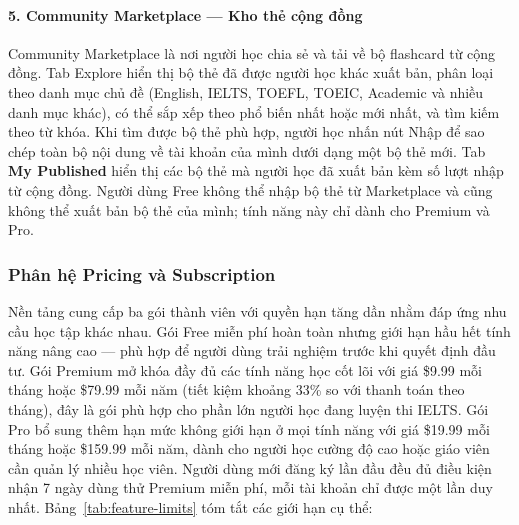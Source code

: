 \paragraph{5. Community Marketplace --- Kho thẻ cộng đồng}

Community Marketplace là nơi người học chia sẻ và tải về bộ flashcard từ cộng đồng. Tab Explore hiển thị bộ thẻ đã được người học khác xuất bản, phân loại theo danh mục chủ đề (English, IELTS, TOEFL, TOEIC, Academic và nhiều danh mục khác), có thể sắp xếp theo phổ biến nhất hoặc mới nhất, và tìm kiếm theo từ khóa. Khi tìm được bộ thẻ phù hợp, người học nhấn nút Nhập để sao chép toàn bộ nội dung về tài khoản của mình dưới dạng một bộ thẻ mới. Tab \textbf{My Published} hiển thị các bộ thẻ mà người học đã xuất bản kèm số lượt nhập từ cộng đồng. Người dùng Free không thể nhập bộ thẻ từ Marketplace và cũng không thể xuất bản bộ thẻ của mình; tính năng này chỉ dành cho Premium và Pro.

\subsubsection{Phân hệ Pricing và Subscription}

Nền tảng cung cấp ba gói thành viên với quyền hạn tăng dần nhằm đáp ứng nhu cầu học tập khác nhau. Gói Free miễn phí hoàn toàn nhưng giới hạn hầu hết tính năng nâng cao --- phù hợp để người dùng trải nghiệm trước khi quyết định đầu tư. Gói Premium mở khóa đầy đủ các tính năng học cốt lõi với giá \$9.99 mỗi tháng hoặc \$79.99 mỗi năm (tiết kiệm khoảng 33\% so với thanh toán theo tháng), đây là gói phù hợp cho phần lớn người học đang luyện thi IELTS. Gói Pro bổ sung thêm hạn mức không giới hạn ở mọi tính năng với giá \$19.99 mỗi tháng hoặc \$159.99 mỗi năm, dành cho người học cường độ cao hoặc giáo viên cần quản lý nhiều học viên. Người dùng mới đăng ký lần đầu đều đủ điều kiện nhận 7 ngày dùng thử Premium miễn phí, mỗi tài khoản chỉ được một lần duy nhất. Bảng~\ref{tab:feature-limits} tóm tắt các giới hạn cụ thể:

